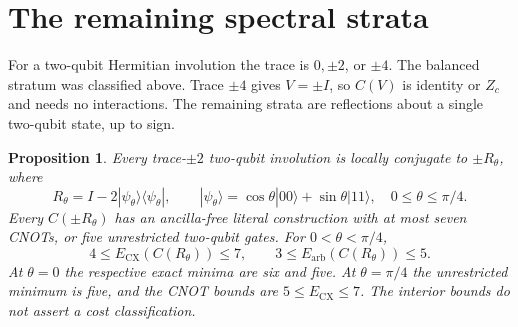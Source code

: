 \documentclass[a4paper,onecolumn,11pt,unpublished]{quantumarticle}
\newtheorem{proposition}{Proposition}
\newcommand{\CNOT}{\mathrm{CX}}
\begin{document}
\section{The remaining spectral strata}\label{sec:reflections}
For a two-qubit Hermitian involution the trace is $0,\pm2$, or $\pm4$.
The balanced stratum was classified above. Trace $\pm4$ gives $V=\pm I$,
so $C(V)$ is identity or $Z_c$ and needs no interactions. The remaining
strata are reflections about a single two-qubit state, up to sign.

\begin{proposition}\label{prop:reflection}
Every trace-$\pm2$ two-qubit involution is locally conjugate to $\pm R_\theta$,
where
\begin{equation}
 R_\theta=I-2|\psi_\theta\rangle\langle\psi_\theta|,\qquad
 |\psi_\theta\rangle=\cos\theta|00\rangle+\sin\theta|11\rangle,
 \quad0\le\theta\le\pi/4.
\end{equation}
Every $C(\pm R_\theta)$ has an ancilla-free literal construction with at most
seven CNOTs, or five unrestricted two-qubit gates. For $0<\theta<\pi/4$,
\begin{equation}
 4\le E_{\CNOT}(C(R_\theta))\le7,\qquad
 3\le E_{\mathrm{arb}}(C(R_\theta))\le5.
\end{equation}
At $\theta=0$ the respective exact minima are six and five. At
$\theta=\pi/4$ the unrestricted minimum is five, and the CNOT bounds are
$5\le E_{\CNOT}\le7$. The interior bounds do not assert a cost classification.
\end{proposition}
\end{document}
